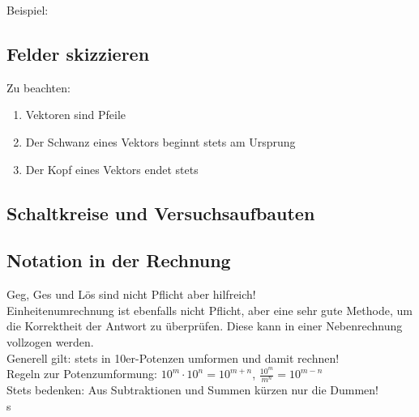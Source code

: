 \documentclass{article}
\begin{document}
        Beispiel:

        \begin{figure}[h]
        \centering
    \end{figure}
        
        \subsection{Felder skizzieren}
        
            Zu beachten:
            \begin{enumerate}
                \item Vektoren sind Pfeile
                \item Der Schwanz eines Vektors beginnt stets am Ursprung
                \item Der Kopf eines Vektors endet stets 
            \end{enumerate}

        \subsection{Schaltkreise und Versuchsaufbauten}

        \subsection{Notation in der Rechnung}

            Geg, Ges und Lös sind nicht Pflicht aber hilfreich! \\
            Einheitenumrechnung ist ebenfalls nicht Pflicht, aber eine sehr gute Methode, um die Korrektheit der Antwort zu überprüfen. Diese kann in einer Nebenrechnung vollzogen werden. \\
            Generell gilt: stets in 10er-Potenzen umformen und damit rechnen! \\
            Regeln zur Potenzumformung: $10^m \cdot 10^n = 10^{m+n}$, $\frac{10^m}{m^n} = 10^{m-n}$ \\
            Stets bedenken: Aus Subtraktionen und Summen kürzen nur die Dummen! \\
            s
\end{document}

